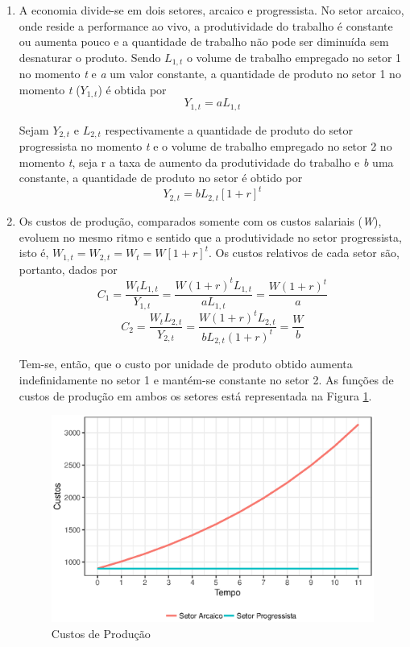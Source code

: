 \documentclass[a4paper, 12pt, openright, oneside, german, french, english, brazil]{abntex2}
\begin{document}
	\begin{enumerate}
		\item A economia divide-se em dois setores, arcaico e progressista. No setor arcaico, onde reside a performance ao vivo, a produtividade do trabalho é constante ou aumenta pouco e a quantidade de trabalho não pode ser diminuída sem desnaturar o produto. Sendo $L_{1,t}$ o volume de trabalho empregado no setor 1 no momento \textit{t} e \textit{a} um valor constante, a quantidade de produto no setor 1 no momento \textit{t} ($Y_{1,t}$) é obtida por $$Y_{1,t} = aL_{1,t}$$

		Sejam $Y_{2,t}$ e $L_{2,t}$ respectivamente a quantidade de produto do setor progressista no momento \textit{t} e o volume de trabalho empregado no setor 2 no momento \textit{t}, seja r a taxa de aumento da produtividade do trabalho e \textit{b} uma constante, a quantidade de produto no setor é obtido por $$Y_{2,t} = bL_{2,t}[1+r]^t $$

		\item Os custos de produção, comparados somente com os custos salariais (\textit{W}), evoluem no mesmo ritmo e sentido que a produtividade no setor progressista, isto é, $W_{1,t} = W_{2,t} = W_t = W[1+r]^t$. Os custos relativos de cada setor são, portanto, dados por
		$$C_1 = \frac{W_tL_{1,t}}{Y_{1,t}} = \frac{W(1+r)^tL_{1,t}}{aL_{1,t}} = \frac{W(1+r)^t}{a}$$
		$$C_2 = \frac{W_tL_{2,t}}{Y_{2,t}} = \frac{W(1+r)^tL_{2,t}}{bL_{2,t}(1+r)^t} = \frac{W}{b}$$

		Tem-se, então, que o custo por unidade de produto obtido aumenta indefinidamente no setor 1 e mantém-se constante no setor 2. As funções de custos de produção em ambos os setores está representada na Figura \ref{custos-de-producao}.

		\begin{figure}[!h]
			\centering
			\caption{Custos de Produção}
			\label{custos-de-producao}
			\includegraphics[scale=.8]{doenca_dos_custos.eps}
		\end{figure}



\end{enumerate}
\end{document}
